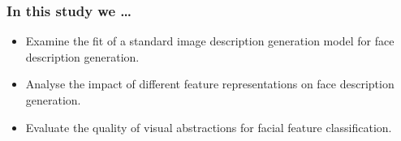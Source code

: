 \documentclass[aspectratio=1610]{beamer} %
\newcommand{\squeezeup}{\vspace{-3mm}}
\newcommand{\squeezedown}{\vspace{2.5mm}}
\begin{document}
\begin{frame}
\vspace{-.3cm}
\begin{figure}[htbp]
\centering
{}
{}
{}

\label{fig:taskdiff}
\end{figure}
\bigskip
\end{frame}


\begin{frame}
\frametitle{In this study we \ldots}
\begin{itemize}
	\item Examine the fit of a standard image description generation model for face description generation.
	\item Analyse the impact of different feature representations on face description generation.
	\item Evaluate the quality of visual abstractions for facial feature classification.
\end{itemize}
\end{frame}
\end{document}
